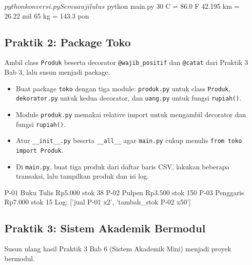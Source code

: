 \begin{keluaran}
$ python konversi.py
Semua uji lulus
$ python main.py
30 C = 86.0 F
42.195 km = 26.22 mil
65 kg = 143.3 pon
\end{keluaran}

\subsection{Praktik 2: Package Toko}

Ambil class \texttt{Produk} beserta decorator \texttt{@wajib\_positif} dan \texttt{@catat} dari Praktik 3 Bab 3, lalu susun menjadi package.

\begin{itemize}
  \item Buat package \texttt{toko} dengan tiga module: \texttt{produk.py} untuk class \texttt{Produk}, \texttt{dekorator.py} untuk kedua decorator, dan \texttt{uang.py} untuk fungsi \texttt{rupiah()}.
  \item Module \texttt{produk.py} memakai relative import untuk mengambil decorator dan fungsi \texttt{rupiah()}.
  \item Atur \texttt{\_\_init\_\_.py} beserta \texttt{\_\_all\_\_} agar \texttt{main.py} cukup menulis \texttt{from toko import Produk}.
  \item Di \texttt{main.py}, buat tiga produk dari daftar baris CSV, lakukan beberapa transaksi, lalu tampilkan produk dan isi log.
\end{itemize}

\begin{keluaran}
P-01 Buku Tulis  Rp5.000  stok 38
P-02 Pulpen      Rp3.500  stok 150
P-03 Penggaris   Rp7.000  stok 15
Log: ['jual P-01 x2', 'tambah_stok P-02 x50']
\end{keluaran}

\subsection{Praktik 3: Sistem Akademik Bermodul}

Susun ulang hasil Praktik 3 Bab 6 (Sistem Akademik Mini) menjadi proyek bermodul.

